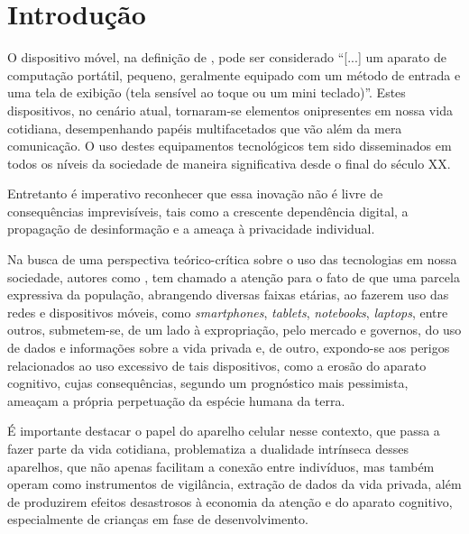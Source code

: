 \documentclass[portuguese]{textolivre}
\begin{document}
\begin{polyabstract}
\begin{english}
\begin{abstract}
\end{abstract}
\end{english}
\end{polyabstract}

\section{Introdução}
O dispositivo móvel, na definição de \textcite[p. 10]{canto_dispositivos_2018}, pode ser considerado “[...] um aparato de computação portátil, pequeno, geralmente equipado com um método de entrada e uma tela de exibição (tela sensível ao toque ou um mini teclado)”. Estes dispositivos, no cenário atual, tornaram-se elementos onipresentes em nossa vida cotidiana, desempenhando papéis multifacetados que vão além da mera comunicação. O uso destes equipamentos tecnológicos tem sido disseminados em todos os níveis da sociedade de maneira significativa desde o final do século XX.

Entretanto é imperativo reconhecer que essa inovação não é livre de consequências imprevisíveis, tais como a crescente dependência digital, a propagação de desinformação e a ameaça à privacidade individual.

Na busca de uma perspectiva teórico-crítica sobre o uso das tecnologias em nossa sociedade, autores como \textcite{assange_2013-1,desmurget_fabrica_2021}, tem chamado a atenção para o fato de que uma parcela expressiva da população, abrangendo diversas faixas etárias, ao fazerem uso das redes e dispositivos móveis, como \textit{smartphones}, \textit{tablets}, \textit{notebooks}, \textit{laptops}, entre outros, submetem-se, de um lado à expropriação, pelo mercado e governos, do uso de dados e informações sobre a vida privada e, de outro, expondo-se aos perigos relacionados ao uso excessivo de tais dispositivos, como a erosão do aparato cognitivo, cujas consequências, segundo um prognóstico mais pessimista, ameaçam a própria perpetuação da espécie humana da terra.

É importante destacar o papel do aparelho celular nesse contexto, que passa a fazer parte da vida cotidiana, problematiza a dualidade intrínseca desses aparelhos, que não apenas facilitam a conexão entre indivíduos, mas também operam como instrumentos de vigilância, extração de dados da vida privada, além de produzirem efeitos desastrosos à economia da atenção e do aparato cognitivo, especialmente de crianças em fase de desenvolvimento.
\end{document}
